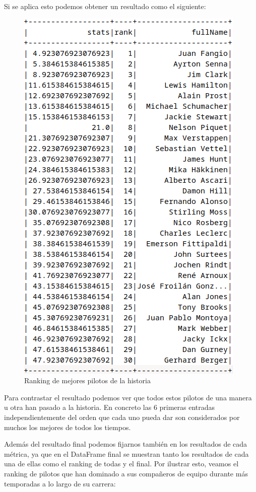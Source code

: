 \documentclass[12pt,twoside,titlepage]{report}
\begin{document}
Si se aplica esto podemos obtener un resultado como el siguiente:

\begin{figure}[H]
	\includegraphics[scale=0.3]{results/bestdrivers/bestdrivers.png}
	\centering
	\caption{Ranking de mejores pilotos de la historia}
	\label{fig:bestDrivers}
	\centering
\end{figure}

Para contrastar el resultado podemos ver que todos estos pilotos de una manera u otra han pasado a la historia. En concreto las 6 primeras entradas independientemente del orden que cada uno pueda dar son considerados por muchos los mejores de todos los tiempos.

Además del resultado final podemos fijarnos también en los resultados de cada métrica, ya que en el DataFrame final se muestran tanto los resultados de cada una de ellas como el ranking de todas y el final. Por ilustrar esto, veamos el ranking de pilotos que han dominado a sus compañeros de equipo durante más temporadas a lo largo de su carrera:
\end{document}
